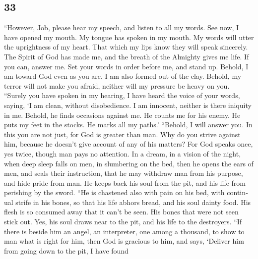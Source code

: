 \begin{paracol}{2}
\switchcolumn
\begin{otherlanguage}{english}

\hypertarget{section-65}{%
\section{33}\label{section-65}}

 ``However, Job, please hear my speech, and listen to all
my words.  See now, I have opened my mouth. My tongue has
spoken in my mouth.  My words will utter the uprightness
of my heart. That which my lips know they will speak sincerely.
 The Spirit of God has made me, and the breath of the
Almighty gives me life.  If you can, answer me. Set your
words in order before me, and stand up.  Behold, I am
toward God even as you are. I am also formed out of the clay.
 Behold, my terror will not make you afraid, neither will
my pressure be heavy on you.  ``Surely you have spoken in
my hearing, I have heard the voice of your words, saying, 
`I am clean, without disobedience. I am innocent, neither is there
iniquity in me.  Behold, he finds occasions against me.
He counts me for his enemy.  He puts my feet in the
stocks. He marks all my paths.'  ``Behold, I will answer
you. In this you are not just, for God is greater than man.
 Why do you strive against him, because he doesn't give
account of any of his matters?  For God speaks once, yes
twice, though man pays no attention.  In a dream, in a
vision of the night, when deep sleep falls on men, in slumbering on the
bed,  then he opens the ears of men, and seals their
instruction,  that he may withdraw man from his purpose,
and hide pride from man.  He keeps back his soul from the
pit, and his life from perishing by the sword.  ``He is
chastened also with pain on his bed, with continual strife in his bones,
 so that his life abhors bread, and his soul dainty food.
 His flesh is so consumed away that it can't be seen. His
bones that were not seen stick out.  Yes, his soul draws
near to the pit, and his life to the destroyers.  ``If
there is beside him an angel, an interpreter, one among a thousand, to
show to man what is right for him,  then God is gracious
to him, and says, `Deliver him from going down to the pit, I have found

\end{otherlanguage}
\end{paracol}
